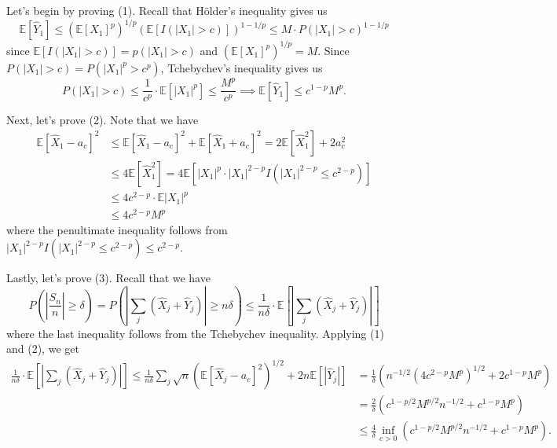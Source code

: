 \documentclass[11pt,letterpaper]{article}
\def\E{\mathbb{E}}
\begin{document}
\begin{solution}
    \quad Let's begin by proving (1). Recall that H\"older's inequality gives us
    \[
        \E[\widehat{Y}_1] \leq (\E[X_1]^p)^{1 /p} (\E[I(|X_1|>c)])^{1 - 1 /p} \leq M\cdot P(|X_1| > c)^{1- 1/p}
    \] 
    since $\E[I(|X_1|>c)] = p(|X_1|>c)$ and $(\E[X_1]^p)^{1 / p} = M$. Since $P(|X_1|>c) = P(|X_1|^p > c^p)$, Tchebychev's inequality gives us
    \[
        P(|X_1|>c)\leq \frac{1}{c^p}\cdot\E[|X_1|^p]\leq \frac{M^p}{c^p} \implies \E[\widehat{Y}_1] \leq c^{1-p}M^p
    .\] 

    \quad Next, let's prove (2). Note that we have
    \[
        \begin{aligned}
            \E[\widehat{X}_1 - a_c]^2 &\leq \E[\widehat{X}_1 - a_c]^2 + \E[\widehat{X}_1+a_c]^2 = 2\E[\widehat{X}_1^2] +2a_c^2\\
            & \leq 4\E[\widehat{X}_1^2] = 4\E[|X_1|^p\cdot |X_1|^{2-p} I(|X_1|^{2-p} \leq c^{2-p})]\\
            & \leq 4c^{2-p}\cdot \E|X_1|^p\\
            & \leq 4c^{2-p} M^p
        \end{aligned}
    \]     
where the penultimate inequality follows from $|X_1|^{2-p}I(|X_1|^{2-p}\leq c^{2-p}) \leq c^{2-p}$.

\quad Lastly, let's prove (3). Recall that we have
\[
    P\left(\left|\frac{S_n}{n}\right| \geq \delta\right) = P\left(\left|\sum_j \left(\widehat{X}_j+\widehat{Y}_j\right)\right| \geq n\delta\right)\leq \frac{1}{n\delta}\cdot \E\left[\left|\sum_j \left(\widehat{X}_j+\widehat{Y}_j\right)\right|\right]
\]
where the last inequality follows from the Tchebychev inequality. Applying (1) and (2), we get
\[
    \begin{aligned}
        \frac{1}{n\delta}\cdot \E\left[\left|\sum_j \left(\widehat{X}_j+\widehat{Y}_j\right)\right|\right] \leq 
        \frac{1}{n\delta}\sum_j \sqrt{n}\left(\E[\widehat{X}_j-a_c]^2\right)^{1 /2}+2n \E[|\widehat{Y}_j|] &= \frac{1}{\delta}\left(n^{-1 /2}(4c^{2 -p}M^p)^{1 /2} + 2c^{1-p} M^p\right)\\
        &= \frac{2}{\delta}\left(c^{1- p /2}M^{p /2}n^{-1 /2} + c^{1-p}M^p\right)\\
        &\leq \frac{4}{\delta} \inf_{c > 0}\left(c^{1-p/2}M^{p/2}n^{-1/2}+c^{1-p}M^p\right).
    \end{aligned}
\] 


\end{solution}
\end{document}
